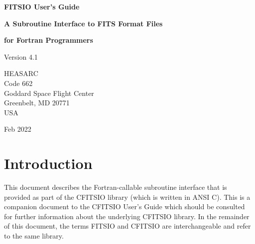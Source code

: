 \documentclass[11pt]{book}
\begin{document}

\begin{titlepage}
\normalsize
\vspace*{4.6cm}
\begin{center}
{\Huge \bf FITSIO User's Guide}\\
\end{center}
\medskip 
\medskip
\begin{center}
{\LARGE \bf A Subroutine Interface to FITS Format Files}\\
\end{center}
\begin{center}
{\LARGE \bf for Fortran Programmers}\\
\end{center}
\medskip
\medskip
\begin{center}
{\Large Version 4.1\\}
\end{center}
\bigskip
\vskip 2.5cm
\begin{center}
{HEASARC\\
Code 662\\
Goddard Space Flight Center\\
Greenbelt, MD 20771\\
USA}
\end{center}

\vfill
\bigskip
\begin{center}
{\Large Feb 2022\\}
\end{center}
\vfill
\end{titlepage}

\clearpage

\tableofcontents

\chapter{Introduction }

This document describes the Fortran-callable subroutine interface that
is provided as part of the CFITSIO library (which is written in ANSI
C).  This is a companion document to the CFITSIO User's Guide which
should be consulted for further information about the underlying
CFITSIO library.  In the remainder of this document, the terms FITSIO
and CFITSIO are interchangeable and refer to the same library.
\end{document}
